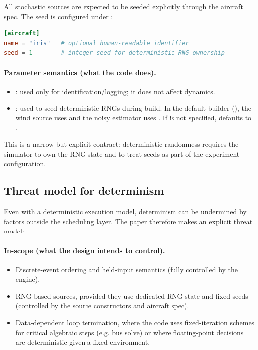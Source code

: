 All stochastic sources are expected to be seeded explicitly through the aircraft spec. The seed is configured under \code{[aircraft]}:

\begin{lstlisting}[language=toml]
[aircraft]
name = "iris"   # optional human-readable identifier
seed = 1        # integer seed for deterministic RNG ownership
\end{lstlisting}

\paragraph{Parameter semantics (what the code does).}
\begin{itemize}[leftmargin=*,itemsep=2pt]
  \item {}: used only for identification/logging; it does not affect dynamics.
  \item {}: used to seed deterministic RNGs during build. In the default builder (), the wind source uses  and the noisy estimator uses . If  is not specified,  defaults to .
\end{itemize}

This is a narrow but explicit contract: deterministic randomness requires the simulator to own the RNG state and to treat seeds as part of the experiment configuration.


\subsection{Threat model for determinism}
\label{sec:determinism-threat-model}

Even with a deterministic execution model, determinism can be undermined by factors outside the scheduling layer. The paper therefore makes an explicit threat model:

\paragraph{In-scope (what the design intends to control).}
\begin{itemize}[leftmargin=*]
  \item Discrete-event ordering and held-input semantics (fully controlled by the engine).
  \item RNG-based sources, provided they use dedicated RNG state and fixed seeds (controlled by the source constructors and aircraft spec).
  \item Data-dependent loop termination, where the code uses fixed-iteration schemes for critical algebraic steps (e.g. bus solve) or where floating-point decisions are deterministic given a fixed environment.
\end{itemize}

